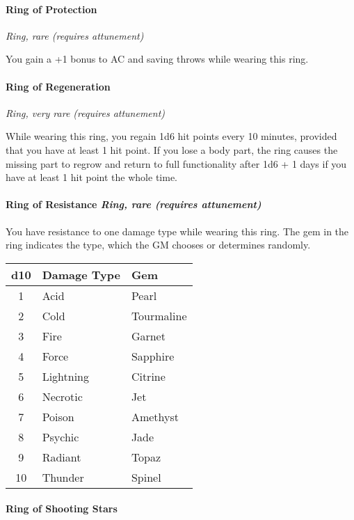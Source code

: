 \documentclass[
]{article}
\begin{document}
\hypertarget{ring-of-protection}{%
\paragraph{Ring of Protection}\label{ring-of-protection}}

\emph{Ring, rare (requires attunement)}

You gain a +1 bonus to AC and saving throws while wearing this ring.

\hypertarget{ring-of-regeneration}{%
\paragraph{Ring of Regeneration}\label{ring-of-regeneration}}

\emph{Ring, very rare (requires attunement)}

While wearing this ring, you regain 1d6 hit points every 10 minutes,
provided that you have at least 1 hit point. If you lose a body part,
the ring causes the missing part to regrow and return to full
functionality after 1d6 + 1 days if you have at least 1 hit point the
whole time.

\hypertarget{ring-of-resistance-ring-rare-requires-attunement}{%
\paragraph{\texorpdfstring{Ring of Resistance \emph{Ring, rare (requires
attunement)}}{Ring of Resistance Ring, rare (requires attunement)}}\label{ring-of-resistance-ring-rare-requires-attunement}}

You have resistance to one damage type while wearing this ring. The gem
in the ring indicates the type, which the GM chooses or determines
randomly.

\begin{longtable}[]{@{}cll@{}}
\toprule
d10 & Damage Type & Gem\tabularnewline
\midrule
\endhead
1 & Acid & Pearl\tabularnewline
2 & Cold & Tourmaline\tabularnewline
3 & Fire & Garnet\tabularnewline
4 & Force & Sapphire\tabularnewline
5 & Lightning & Citrine\tabularnewline
6 & Necrotic & Jet\tabularnewline
7 & Poison & Amethyst\tabularnewline
8 & Psychic & Jade\tabularnewline
9 & Radiant & Topaz\tabularnewline
10 & Thunder & Spinel\tabularnewline
\bottomrule
\end{longtable}

\hypertarget{ring-of-shooting-stars}{%
\paragraph{Ring of Shooting Stars}\label{ring-of-shooting-stars}}
\end{document}
